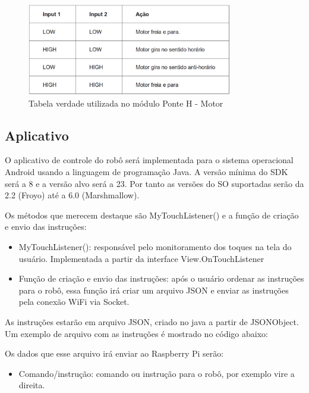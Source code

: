 \begin{figure}[H]
    \centering
    \includegraphics[width=0.8\textwidth]{figuras/tabela_ponte_H_2.eps}
    \caption{Tabela verdade utilizada no módulo Ponte H - Motor}
    \label{fig:tabela_ponte_H_2}
\end{figure}

\subsection{Aplicativo}

O aplicativo de controle do robô será implementada para o sistema operacional Android usando a linguagem de programação Java. A versão mínima do SDK será a 8 e a versão alvo será a 23. Por tanto as versões do SO suportadas serão da 2.2 (Froyo) até a 6.0 (Marshmallow).

Os métodos que merecem destaque são MyTouchListener() e a função de criação e envio das instruções:
\begin{itemize}
\item MyTouchListener(): responsável pelo monitoramento dos toques na tela do usuário. Implementada a partir da interface View.OnTouchListener
\item Função de criação e envio das instruções: após o usuário ordenar as instruções para o robô, essa função irá criar um arquivo JSON e enviar as instruções pela conexão WiFi via Socket.
\end{itemize}

As instruções estarão em arquivo JSON, criado no java a partir de JSONObject. Um exemplo de arquivo com as instruções é mostrado no código abaixo:



Os dados que esse arquivo irá enviar ao Raspberry Pi serão:
\begin{itemize}
	\item Comando/instrução: comando ou instrução para o robô, por exemplo vire a direita.
\end{itemize}

